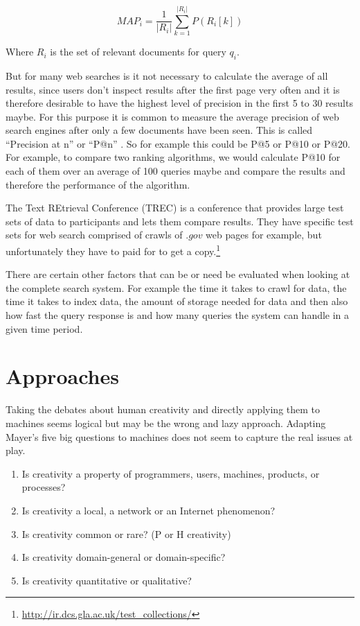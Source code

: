\begin{equation}
  MAP_i = \frac{1}{|R_i|} \sum_{k=1}^{|R_i|} P(R_i[k])
  \label{eq:MAP}
\end{equation}

Where $R_i$ is the set of relevant documents for query $q_i$.

But for many web searches is it not necessary to calculate the average of all results, since users don't inspect results after the first page very often and it is therefore desirable to have the highest level of precision in the first 5 to 30 results maybe. For this purpose it is common to measure the average precision of web search engines after only a few documents have been seen. This is called ``Precision at n'' or ``P@n'' \parencite[p.140]{Baeza-Yates2011}. So for example this could be P@5 or P@10 or P@20. For example, to compare two ranking algorithms, we would calculate P@10 for each of them over an average of 100 queries maybe and compare the results and therefore the performance of the algorithm.

The Text REtrieval Conference (TREC) is a conference that provides large test sets of data to participants and lets them compare results. They have specific test sets for web search comprised of crawls of $.gov$ web pages for example, but unfortunately they have to paid for to get a copy.\footnote{\url{http://ir.dcs.gla.ac.uk/test_collections/}}%

There are certain other factors that can be or need be evaluated when looking at the complete search system. For example the time it takes to crawl for data, the time it takes to index data, the amount of storage needed for data and then also how fast the query response is and how many queries the system can handle in a given time period.


\section{Approaches}

Taking the debates about human creativity  and directly applying them to machines seems logical but may be the wrong and lazy approach. Adapting Mayer’s five big questions to machines does not seem to capture the real issues at play.

\begin{enumerate}
  \item Is creativity a property of programmers, users, machines, products, or processes?
  \item Is creativity a local, a network or an Internet phenomenon?
  \item Is creativity common or rare? (P or H creativity)
  \item Is creativity domain-general or domain-specific?
  \item Is creativity quantitative or qualitative?
\end{enumerate}

